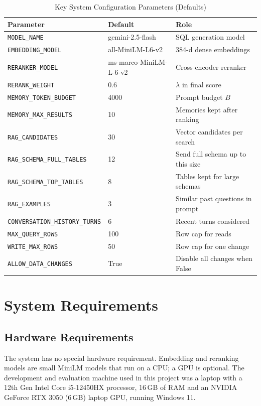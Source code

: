\begin{table}[H]
    \centering
    \small
    \caption{Key System Configuration Parameters (Defaults)}
    \begin{tabular}{p{6.4cm} p{4.2cm} p{4.6cm}}
        \toprule
        \textbf{Parameter} & \textbf{Default} & \textbf{Role} \\
        \midrule
        \texttt{MODEL\_NAME}              & gemini-2.5-flash & SQL generation model \\[1pt]
        \texttt{EMBEDDING\_MODEL}         & all-MiniLM-L6-v2 & 384-d dense embeddings \\[1pt]
        \texttt{RERANKER\_MODEL}          & ms-marco-MiniLM-L-6-v2 & Cross-encoder reranker \\[1pt]
        \texttt{RERANK\_WEIGHT}           & 0.6   & $\lambda$ in final score \\[1pt]
        \texttt{MEMORY\_TOKEN\_BUDGET}    & 4000  & Prompt budget $B$ \\[1pt]
        \texttt{MEMORY\_MAX\_RESULTS}     & 10    & Memories kept after ranking \\[1pt]
        \texttt{RAG\_CANDIDATES}          & 30    & Vector candidates per search \\[1pt]
        \texttt{RAG\_SCHEMA\_FULL\_TABLES}& 12    & Send full schema up to this size \\[1pt]
        \texttt{RAG\_SCHEMA\_TOP\_TABLES} & 8     & Tables kept for large schemas \\[1pt]
        \texttt{RAG\_EXAMPLES}            & 3     & Similar past questions in prompt \\[1pt]
        \texttt{CONVERSATION\_HISTORY\_TURNS} & 6 & Recent turns considered \\[1pt]
        \texttt{MAX\_QUERY\_ROWS}         & 100   & Row cap for reads \\[1pt]
        \texttt{WRITE\_MAX\_ROWS}         & 50    & Row cap for one change \\[1pt]
        \texttt{ALLOW\_DATA\_CHANGES}     & True  & Disable all changes when False \\
        \bottomrule
    \end{tabular}
    \label{tab:config}
\end{table}

\section{System Requirements}

\subsection{Hardware Requirements}
The system has no special hardware requirement. Embedding and reranking models are small
MiniLM models that run on a CPU; a GPU is optional. The development and evaluation machine
used in this project was a laptop with a 12th Gen Intel Core i5-12450HX processor, 16\,GB of
RAM and an NVIDIA GeForce RTX 3050 (6\,GB) laptop GPU, running Windows 11.

